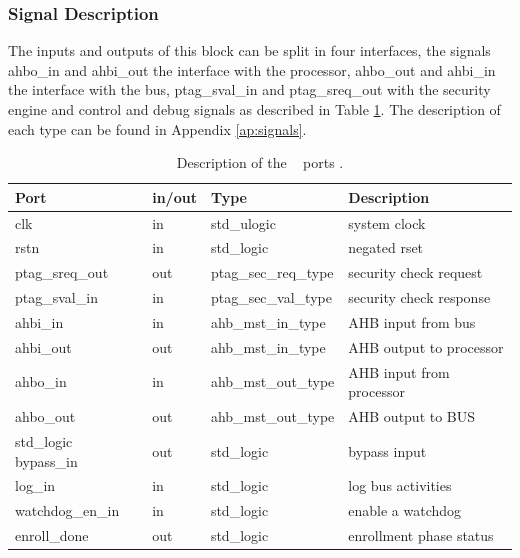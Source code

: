 \subsubsection{Signal Description}

The inputs and outputs of this block can be split in four interfaces,
the signals  ahbo\_in and ahbi\_out the interface with the processor,  ahbo\_out  and ahbi\_in
the interface with the bus, ptag\_sval\_in and ptag\_sreq\_out with the security engine and control and debug signals as described in Table \ref{table:shports}.
 The description of each type can be found in Appendix \ref{ap:signals}.

\begin{table}[H]
\begin{tabular}{l l l l}
\textbf{Port}   & \textbf{in/out} & \textbf{Type}        & \textbf{Description} 	\\ \hline \hline
clk             & in              & std\_ulogic          & system clock         	\\ \hline
rstn            & in              & std\_logic           & negated rset         	\\ \hline
ptag\_sreq\_out & out             & ptag\_sec\_req\_type & security check request    	\\ \hline
ptag\_sval\_in  & in              & ptag\_sec\_val\_type & security check response  	\\ \hline
ahbi\_in        & in              & ahb\_mst\_in\_type   & AHB input from bus      	\\ \hline
ahbi\_out       & out             & ahb\_mst\_in\_type   & AHB output to processor      \\ \hline
ahbo\_in        & in              & ahb\_mst\_out\_type  & AHB input from processor    \\ \hline
ahbo\_out       & out             & ahb\_mst\_out\_type  & AHB output to BUS            \\ \hline
std\_logic         
bypass\_in      & out             & std\_logic           & bypass input         	\\ \hline
log\_in         & in              & std\_logic           & log bus activities       \\ \hline
watchdog\_en\_in  & in            & std\_logic           & enable a watchdog             \\ \hline
enroll\_done     & out             & std\_logic          & enrollment phase status            \\ \hline

\end{tabular}
 \caption{Description of the \handler~ ports .}
 \label{table:shports}

\end{table}


